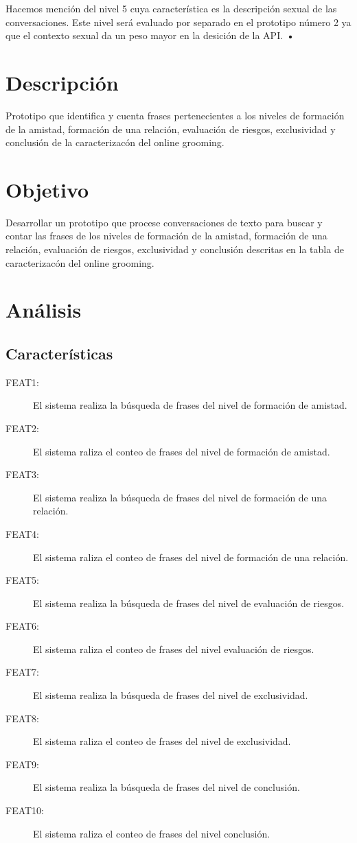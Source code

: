 Hacemos menci\'on del nivel 5 cuya caracter\'istica es la descripci\'on sexual de las conversaciones. Este nivel ser\'a evaluado por separado en el prototipo n\'umero 2 ya que el contexto sexual da un peso mayor en la desici\'on de la API.
\textbf{•}

\section{Descripci\'on}
Prototipo que identifica y cuenta frases pertenecientes a los niveles de  formaci\'on de la amistad, formaci\'on de una relaci\'on, evaluaci\'on de riesgos, exclusividad y conclusi\'on de la caracterizac\'on del online grooming.

\section{Objetivo}
Desarrollar un prototipo que procese conversaciones de texto para buscar y contar las frases de los niveles de formaci\'on de la amistad, formaci\'on de una relaci\'on, evaluaci\'on de riesgos, exclusividad y conclusi\'on descritas en la tabla de caracterizac\'on del online grooming.


\section{An\'alisis}
\subsection{Caracter\'isticas}

\begin{description}
\item[FEAT1:] El sistema realiza la b\'usqueda de frases del nivel de formaci\'on de amistad.
\item[FEAT2:] El sistema raliza el conteo de frases del nivel de formaci\'on de amistad.
\item[FEAT3:] El sistema realiza la b\'usqueda de frases del nivel de formaci\'on de una relaci\'on.
\item[FEAT4:] El sistema raliza el conteo de frases del nivel de formaci\'on de una relaci\'on.
\item[FEAT5:] El sistema realiza la b\'usqueda de frases del nivel de evaluaci\'on de riesgos.
\item[FEAT6:] El sistema raliza el conteo de frases del nivel evaluaci\'on de riesgos.
\item[FEAT7:] El sistema realiza la b\'usqueda de frases del nivel de exclusividad.
\item[FEAT8:] El sistema raliza el conteo de frases del nivel de exclusividad.
\item[FEAT9:] El sistema realiza la b\'usqueda de frases del nivel de conclusi\'on.
\item[FEAT10:] El sistema raliza el conteo de frases del nivel conclusi\'on.
\end{description}

